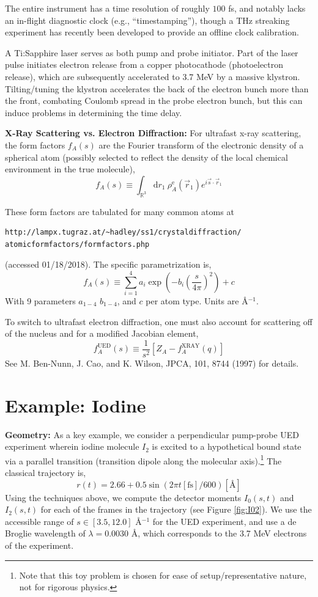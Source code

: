 \documentclass[fleqn,oneside,12pt]{article}
\begin{document}
The entire instrument has a time resolution of roughly $100$ fs, and notably
lacks an in-flight diagnostic clock (e.g., ``timestamping''), though a THz
streaking experiment has recently been developed to provide an offline clock
calibration. 

A Ti:Sapphire laser serves as both pump and probe initiator. Part of the laser
pulse initiates electron release from a copper photocathode (photoelectron
release), which are subsequently accelerated to 3.7 MeV by a massive klystron.
Tilting/tuning the klystron accelerates the back of the electron bunch more than
the front, combating Coulomb spread in the probe electron bunch, but this can
induce problems in determining the time delay. 

\textbf{X-Ray Scattering vs. Electron Diffraction:} For ultrafast x-ray
scattering, the form factors $f_{A} (s)$ are the Fourier transform of the
electronic density of a spherical atom (possibly selected to reflect the density
of the local chemical environment in the true molecule),
\[
f_{A} (s)
\equiv
\int_{\mathbb{R}^3}
\mathrm{d} r_1
\
\rho_{A}^{\mathrm{e}} (\vec r_{1})
e^{i \vec s \cdot \vec r_1}
\]

These form factors are tabulated for many common atoms at
\begin{verbatim}
http://lampx.tugraz.at/~hadley/ss1/crystaldiffraction/
atomicformfactors/formfactors.php
\end{verbatim}
(accessed 01/18/2018). The specific parametrization is,
\[
f_{A} (s)
\equiv
\sum_{i=1}^{4}
a_{i}
\exp
\left (
-b_{i}
\left (
\frac{s}{4\pi}
\right )^2
\right )
+
c
\]
With 9 parameters $a_{1-4}$ $b_{1-4}$, and $c$ per atom type. Units are
\AA{}$^{-1}$.

To switch to ultrafast electron diffraction, one must also account for
scattering off of the nucleus and for a modified Jacobian element,
\[
f_{A}^{\mathrm{UED}}
(s)
\equiv
\frac{1}{s^2}
\left [
Z_{A}
-
f_{A}^{\mathrm{XRAY}}
(q)
\right ]
\]
See M. Ben-Nunn, J. Cao, and K. Wilson, JPCA, 101, 8744 (1997) for details.

\section{Example: Iodine}

\textbf{Geometry:} As a key example, we consider a perpendicular pump-probe UED
experiment wherein iodine molecule $I_{2}$ is excited to a hypothetical bound
state via a parallel transition (transition dipole along the molecular
axis).\footnote{Note that this toy problem is chosen for ease of
setup/representative nature, not for rigorous physics.} The classical trajectory
is,
\[
r (t)
=
2.66
+
0.5 \sin (2 \pi t [\mbox{fs}]/ 600)
[ \mbox{\AA{}} ]
\]
Using the techniques above, we compute the detector moments $I_0 (s, t)$ and
$I_2 (s, t)$ for each of the frames in the trajectory (see Figure
\ref{fig:I02}). We use the accessible range of $s \in [3.5, 12.0]$ \AA{}$^{-1}$
for the UED experiment, and use a de Broglie wavelength of $\lambda = 0.0030$
\AA{}, which corresponds to the 3.7 MeV electrons of the experiment.
\end{document}
